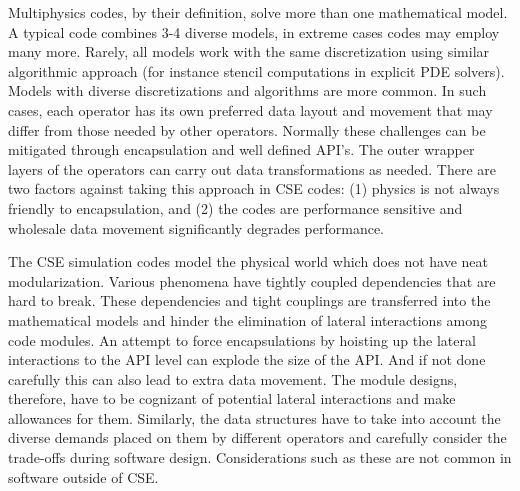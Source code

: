 \label{sec:domain-challenges}
Multiphysics codes, by their definition, solve more than one
mathematical model. A typical code combines 3-4
diverse models, in extreme cases codes may employ many more.
Rarely, all models work with the same
discretization using similar algorithmic approach (for instance
stencil computations in explicit PDE solvers).
Models with diverse discretizations and algorithms are more common. In
such cases, each operator has
its own preferred data layout and movement that may differ
from those needed by other operators.  Normally these challenges
can be mitigated through encapsulation and well defined API's. The outer
wrapper layers of the operators can carry out data transformations as
needed. There are two factors against taking this approach in CSE
codes: (1) physics is not always friendly to encapsulation, and (2)
the codes are performance sensitive and wholesale data movement
significantly degrades performance. 

The CSE simulation codes model the physical world which does not
have neat modularization. Various phenomena have tightly coupled
dependencies that are hard to break. These dependencies and tight
couplings are transferred into the mathematical models and hinder the
elimination of lateral interactions among code modules. An attempt to
force encapsulations by hoisting up the lateral interactions to the
API level can explode the size of the API. And if not done carefully
this can also lead to extra data movement. The module designs,
therefore, have to be cognizant of potential lateral interactions and
make allowances for them. Similarly, the data structures have to take
into account the diverse demands placed on them by different operators
and carefully consider the trade-offs during software
design. Considerations such as these are not common in software
outside of CSE.   


